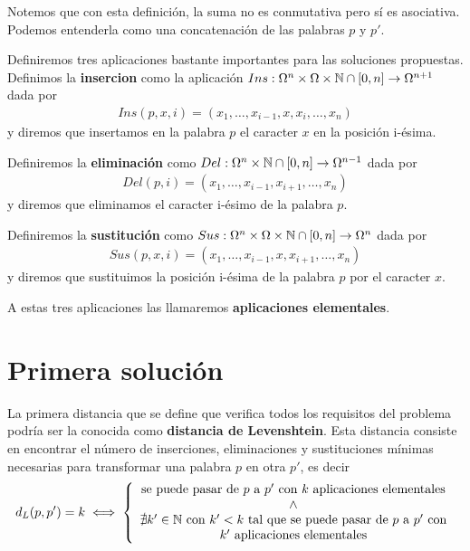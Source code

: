 \documentclass[12pt]{article}
\begin{document}
Notemos que con esta definición, la suma no es conmutativa pero sí es asociativa. Podemos entenderla como una concatenación de las palabras $p$ y $p'$. 

Definiremos tres aplicaciones bastante importantes para las soluciones propuestas.
Definimos la \textbf{insercion} como la aplicación $Ins:\Omega^n \times \Omega \times \mathbb{N}\cap [0,n] \to \Omega^{n+1}$ dada por 
\begin{align*}
    Ins(p,x,i) = (x_1, \dots, x_{i-1}, x, x_i, \dots, x_n)
\end{align*}
y diremos que insertamos en la palabra $p$ el caracter $x$ en la posición i-ésima.

Definiremos la \textbf{eliminación} como $Del:\Omega^n \times \mathbb{N}\cap [0,n] \to \Omega^{n-1}$ dada por
\begin{align*}
    Del(p,i) = (x_1,\dots,x_{i-1}, x_{i+1}, \dots, x_n)
\end{align*}
y diremos que eliminamos el caracter i-ésimo de la palabra $p$.

Definiremos la \textbf{sustitución} como $Sus:\Omega^n \times \Omega \times \mathbb{N}\cap [0,n] \to \Omega^n$ dada por
\begin{align*}
    Sus(p,x,i) = (x_1, \dots, x_{i-1}, x, x_{i+1}, \dots, x_n)
\end{align*}
y diremos que sustituimos la posición i-ésima de la palabra $p$ por el caracter $x$.

A estas tres aplicaciones las llamaremos \textbf{aplicaciones elementales}.

\section{Primera solución}

La primera distancia que se define que verifica todos los requisitos del problema podría ser la conocida como \textbf{ distancia de Levenshtein}. Esta distancia consiste en encontrar el número de inserciones, eliminaciones y sustituciones mínimas necesarias para transformar una palabra $p$ en otra $p'$, es decir
\begin{align*}
    d_L(p,p')=k \iff \left\{
        \begin{array}{c}
            \text{se puede pasar de $p$ a $p'$ con $k$ aplicaciones elementales}\\
            \wedge\\
            \nexists k'\in \mathbb{N} \text{ con } k'<k \text{ tal que se puede pasar de $p$ a $p'$ con} \\
            \text{$k'$ aplicaciones elementales}
        \end{array} 
    \right.
\end{align*}
\end{document}
